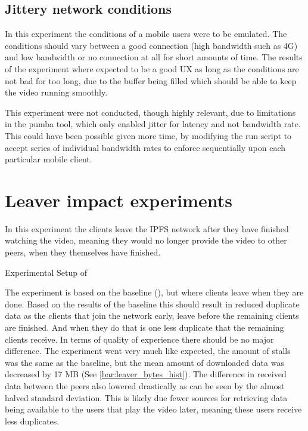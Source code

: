 \if{}

\fi

\subsection{Jittery network conditions}
In this experiment the conditions of a mobile users were to be emulated. The conditions should vary between a good connection (high bandwidth such as 4G) and low bandwidth or no connection at all for short amounts of time.
The results of the experiment where expected to be a good \ac{UX} as long as the conditions are not bad for too long, due to the buffer being filled which should be able to keep the video running smoothly.

This experiment were not conducted, though highly relevant, due to limitations in the pumba tool, which only enabled jitter for latency and not bandwidth rate.
This could have been possible given more time, \eg by modifying the run script to accept series of individual bandwidth rates to enforce sequentially upon each particular mobile client.

\FloatBarrier \section{Leaver impact experiments}
\label{sec:eval_leaver}
In this experiment the clients  leave the \ac{IPFS} network after they have finished watching the video, meaning they would no longer provide the video to other peers, when they themselves have finished.

\begin{table}[!htbp]
    \myfloatalign
    \caption[Experimental Setup of Leaver]{Experimental Setup of }
    \label{tab:exp_overview_leaver}
    
\end{table}

The experiment is based on the baseline (), but where clients leave when they are done. Based on the results of the baseline this should result in reduced duplicate data as the clients that join the network early, leave before the remaining clients are finished. And when they do that is one less duplicate that the remaining clients receive. In terms of quality of experience there should be no major difference.
The experiment went very much like expected, the amount of stalls was the same as the baseline, but the mean amount of downloaded data was decreased by 17 \ac{MB} (See \autoref{bar:leaver_bytes_hist}). The difference in received data between the peers also lowered drastically as can be seen by the almost halved standard deviation. This is likely due fewer sources for retrieving data being available to the users that play the video later, meaning these users receive less duplicates.

